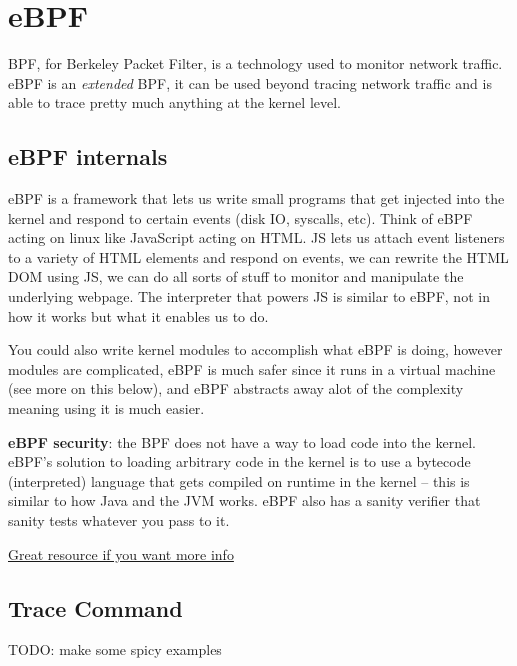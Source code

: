\section{eBPF}
BPF, for Berkeley Packet Filter, is a technology used to monitor network traffic. eBPF is an \textit{extended} BPF, it can be used beyond tracing network traffic and is able to trace pretty much anything at the kernel level.

\subsection{eBPF internals}
eBPF is a framework that lets us write small programs that get injected into the kernel and respond to certain events (disk IO, syscalls, etc). Think of eBPF acting on linux like JavaScript acting on HTML. JS lets us attach event listeners to a variety of HTML elements and respond on events, we can rewrite the HTML DOM using JS, we can do all sorts of stuff to monitor and manipulate the underlying webpage. The interpreter that powers JS is similar to eBPF, not in how it works but what it enables us to do.

You could also write kernel modules to accomplish what eBPF is doing, however modules are complicated, eBPF is much safer since it runs in a virtual machine (see more on this below), and eBPF abstracts away alot of the complexity meaning using it is much easier. 

\textbf{eBPF security}: the BPF does not have a way to load code into the kernel. eBPF's solution to loading arbitrary code in the kernel is to use a bytecode (interpreted) language that gets compiled on runtime in the kernel -- this is similar to how Java and the JVM works. eBPF also has a sanity verifier that sanity tests whatever you pass to it.

{\color{blue}\href{http://www.brendangregg.com/blog/2019-01-01/learn-ebpf-tracing.html}{Great resource if you want more info}}

\subsection{Trace Command}
TODO: make some spicy examples